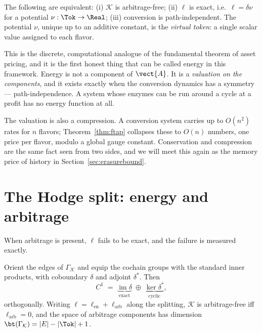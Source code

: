 \begin{theorem}
\label{thm:ftap}
The following are equivalent: (i) $\mathcal{K}$ is arbitrage-free; (ii)
$\ell$ is exact, i.e.\ $\ell = \delta\nu$ for a potential
$\nu : \Tok \to \Real$; (iii) conversion is path-independent.  The
potential $\nu$, unique up to an additive constant, is the
\emph{virtual token}: a single scalar value assigned to each flavor.
\end{theorem}

This is the discrete, computational analogue of the fundamental theorem of
asset pricing, and it is the first honest thing that can be called energy
in this framework.  Energy is not a component of $\vect{A}$.  It is a
\emph{valuation on the components}, and it exists exactly when the
conversion dynamics has a symmetry --- path-independence.  A system whose
enzymes can be run around a cycle at a profit has no energy function at
all.

\begin{remark}[Compression]
The valuation is also a compression.  A conversion system carries up to
$O(n^2)$ rates for $n$ flavors; Theorem~\ref{thm:ftap} collapses these to
$O(n)$ numbers, one price per flavor, modulo a global gauge constant.
Conservation and compression are the same fact seen from two sides, and we
will meet this again as the memory price of history in
Section~\ref{sec:erasurebound}.
\end{remark}

\section{The Hodge split: energy and arbitrage}

When arbitrage is present, $\ell$ fails to be exact, and the failure is
measured exactly.

\begin{proposition}
\label{prop:hodge}
Orient the edges of $\Gamma_{\mathcal K}$ and equip the cochain groups
with the standard inner products, with coboundary $\delta$ and adjoint
$\delta^{\ast}$.  Then
\[
  C^1 \;=\; \underbrace{\operatorname{im}\delta}_{\text{exact}}
        \;\oplus\; \underbrace{\ker\delta^{\ast}}_{\text{cyclic}},
\]
orthogonally.  Writing $\ell = \ell_{\mathrm{en}} + \ell_{\mathrm{arb}}$
along the splitting, $\mathcal{K}$ is arbitrage-free iff
$\ell_{\mathrm{arb}} = 0$, and the space of arbitrage components has
dimension $\bt(\Gamma_{\mathcal K}) = |E| - |\Tok| + 1$.
\end{proposition}

